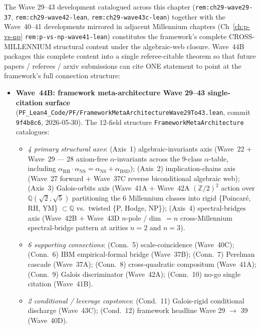 \begin{remark}\label{rem:ch29-wave44b-lean}
The Wave 29--43 development catalogued across this chapter (\texttt{rem:ch29-wave29-37}, \texttt{rem:ch29-wave42-lean}, \texttt{rem:ch29-wave43c-lean}) together with the Wave~40--41 developments mirrored in adjacent Millennium chapters (Ch~\ref{ch:p-vs-np} \texttt{rem:p-vs-np-wave41-lean}) constitutes the framework's complete CROSS-MILLENNIUM structural content under the algebraic-web closure. Wave~44B packages this complete content into a single referee-citable theorem so that future papers / referees / arxiv submissions can cite ONE statement to point at the framework's full connection structure:
\begin{itemize}
  \item \textbf{Wave~44B: framework meta-architecture Wave 29--43 single-citation surface} (\texttt{PF\_Lean4\_Code/PF/FrameworkMetaArchitectureWave29To43.lean}, commit \texttt{9f4b8c6}, 2026-05-30). The 12-field structure \texttt{FrameworkMetaArchitecture} catalogues:
  \begin{itemize}
    \item \emph{4 primary structural axes}: (Axis~1) algebraic-invariants axis (Wave~22 $+$ Wave~29 --- 28 axiom-free $\alpha$-invariants across the 9-class $\alpha$-table, including $\alpha_{\mathrm{RH}} \cdot \alpha_{\mathrm{NS}} = \alpha_{\mathrm{NS}} + \alpha_{\mathrm{BSD}}$); (Axis~2) implication-chains axis (Wave~27 forward $+$ Wave~37C reverse biconditional algebraic web); (Axis~3) Galois-orbits axis (Wave~41A $+$ Wave~42A $(\mathbb{Z}/2)^2$ action over $\mathbb{Q}(\sqrt{2}, \sqrt{5})$ partitioning the 6 Millennium classes into rigid \{Poincar\'e, RH, YM\} $\subset \mathbb{Q}$ vs.\ twisted \{P, Hodge, NP\}); (Axis~4) spectral-bridges axis (Wave~42B $+$ Wave~43D $n$-pole / dim~$=n$ cross-Millennium spectral-bridge pattern at arities $n = 2$ and $n = 3$).
    \item \emph{6 supporting connections}: (Conn.~5) scale-coincidence (Wave~40C); (Conn.~6) IBM empirical-formal bridge (Wave~37B); (Conn.~7) Perelman cascade (Wave~37A); (Conn.~8) cross-quadratic compositum (Wave~41A); (Conn.~9) Galois discriminator (Wave~42A); (Conn.~10) no-go single citation (Wave~41B).
    \item \emph{2 conditional / leverage capstones}: (Cond.~11) Galois-rigid conditional discharge (Wave~43C); (Cond.~12) framework headline Wave 29 $\to$ 39 (Wave~40D).

\end{itemize}
\end{itemize}
\end{remark}

